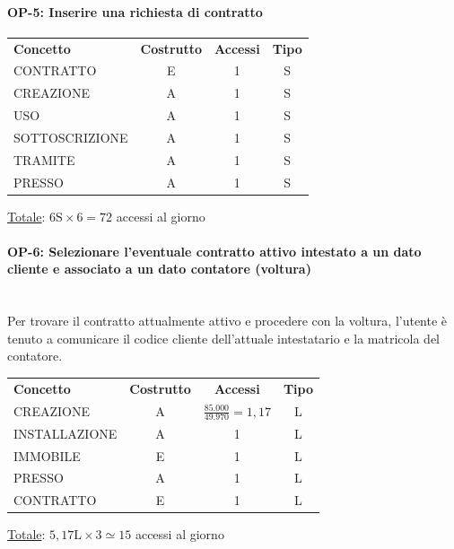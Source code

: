 \documentclass[a4paper,12pt]{report}
\begin{document}
\paragraph{OP-5: Inserire una richiesta di contratto}
\begin{center}
\begin{tabular}{@{}l c  c  c@{}}
    \hline
    \textbf{Concetto} & \textbf{Costrutto} & \textbf{Accessi} & \textbf{Tipo} \\ [0.5ex]
    CONTRATTO & E & 1 & S \\
    CREAZIONE & A & 1 & S \\
    USO & A & 1 & S \\
    SOTTOSCRIZIONE & A & 1 & S \\
    TRAMITE & A & 1 & S \\
    PRESSO & A & 1 & S \\
    \hline
\end{tabular}
\end{center}
\underline{Totale}: $6 \text{S} \times 6 = 72$ accessi al giorno 
\paragraph{OP-6: Selezionare l'eventuale contratto attivo intestato a un dato cliente e associato a un dato contatore (voltura)}\mbox{}\\
Per trovare il contratto attualmente attivo e procedere con la voltura, l'utente è tenuto a comunicare il codice cliente dell'attuale intestatario e la matricola del contatore.
\begin{center}
\begin{tabular}{@{}l c  c  c@{}}
    \hline
    \textbf{Concetto} & \textbf{Costrutto} & \textbf{Accessi} & \textbf{Tipo} \\ [0.5ex]
    CREAZIONE & A & $\frac{85.000}{49.970} = 1,17$ & L \\
    INSTALLAZIONE & A & 1 & L \\
    IMMOBILE & E & 1 & L \\
    PRESSO & A & 1 & L \\
    CONTRATTO & E & 1 & L \\
    \hline
\end{tabular}
\end{center}
\underline{Totale}: $5,17\text{L} \times 3 \simeq 15$ accessi al giorno
\end{document}
